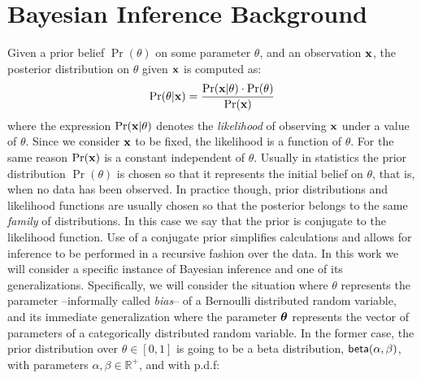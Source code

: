 \documentclass[sigconf]{acmart}
\begin{document}
\section{Bayesian Inference Background}
\label{sec_background}
Given a prior belief $\Pr(\theta)$ on some parameter $\theta$,
and an observation $\textbf{x}$, the posterior distribution on $\theta$ given $\textbf{x}$ is computed as:
\[
  \Pr(\theta | \textbf{x}) = \frac{\Pr(\textbf{x} | \theta) \cdot \Pr(\theta)}{\Pr(\textbf{x})}
\]
where the expression $\Pr(\textbf{x} | \theta)$ denotes the
\emph{likelihood} of observing $\textbf{x}$ under a value of
$\theta$. Since we consider $\textbf{x}$ to be fixed, the likelihood is
a function of $\theta$.
For the same reason $\Pr(\textbf{x})$ is a constant independent of $\theta$.
Usually in statistics the prior distribution $\Pr(\theta)$ is chosen so that it represents
the initial belief on $\theta$, that is, when no data has been observed. In practice though,
prior distributions and likelihood functions are usually chosen so that the posterior
belongs to the same \emph{family} of distributions. In this case we say that the prior
is conjugate to the likelihood function. Use of a conjugate prior
simplifies calculations and allows for inference to be performed in a
recursive fashion over the data.
In this work we will consider a specific instance of Bayesian inference and one of its generalizations.
Specifically, we will consider the situation where $\theta$ represents
the parameter --informally called \emph{bias}-- of a Bernoulli
distributed random variable, and its immediate generalization where
the parameter $\boldsymbol{\theta}$ represents the vector of parameters of a
categorically distributed random variable.  In the former case, the
prior distribution over $\theta\in [0,1]$ is going to be a beta
distribution, $\mathsf{beta}(\alpha, \beta)$, with parameters
$\alpha,\beta\in\mathbb{R}^{+}$, and with p.d.f:
\end{document}
